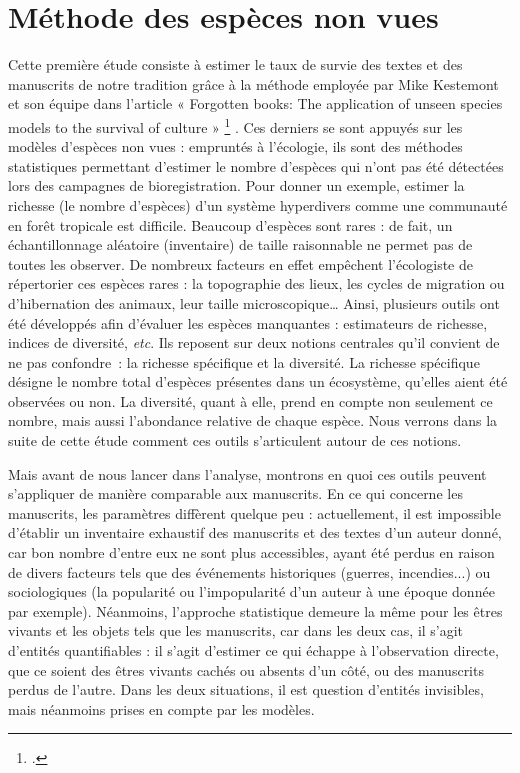 \documentclass[a4paper,twoside,12pt]{book}
\begin{document}
\chapter{Méthode des espèces non vues}


Cette première étude consiste à estimer le taux de survie des textes et des manuscrits de notre tradition grâce à la méthode employée par Mike Kestemont et son équipe dans l’article « Forgotten books: The application of unseen species models to the survival of culture » \footcite{kestemont} . Ces derniers se sont appuyés sur les modèles d’espèces non vues : empruntés à l’écologie, ils sont des méthodes statistiques permettant d’estimer le nombre d'espèces qui n’ont pas été détectées lors des campagnes de bioregistration. Pour donner un exemple, estimer la richesse (le nombre d’espèces) d’un système hyperdivers comme une communauté en forêt tropicale est difficile. Beaucoup d’espèces sont rares : de fait, un échantillonnage aléatoire (inventaire) de taille raisonnable ne permet pas de toutes les observer. De nombreux facteurs en effet empêchent l’écologiste de répertorier ces espèces rares : la topographie des lieux, les cycles de migration ou d’hibernation des animaux, leur taille microscopique… Ainsi, plusieurs outils ont été développés afin d’évaluer les espèces manquantes : estimateurs de richesse, indices de diversité, \textit{etc}. Ils reposent sur deux notions centrales qu’il convient de ne pas confondre~: la richesse spécifique et la diversité. La richesse spécifique désigne le nombre total d’espèces présentes dans un écosystème, qu’elles aient été observées ou non. La diversité, quant à elle, prend en compte non seulement ce nombre, mais aussi l’abondance relative de chaque espèce. Nous verrons dans la suite de cette étude comment ces outils s’articulent autour de ces notions.

Mais avant de nous lancer dans l’analyse, montrons en quoi ces outils peuvent s’appliquer de manière comparable aux manuscrits.
En ce qui concerne les manuscrits, les paramètres diffèrent quelque peu : actuellement, il est impossible d'établir un inventaire exhaustif des manuscrits et des textes d'un auteur donné, car bon nombre d'entre eux ne sont plus accessibles, ayant été perdus en raison de divers facteurs tels que des événements historiques (guerres, incendies...) ou sociologiques (la popularité ou l'impopularité d'un auteur à une époque donnée par exemple). Néanmoins, l'approche statistique demeure la même pour les êtres vivants et les objets tels que les manuscrits, car dans les deux cas, il s'agit d'entités quantifiables : il s’agit d’estimer ce qui échappe à l’observation directe, que ce soient des êtres vivants cachés ou absents d’un côté, ou des manuscrits perdus de l’autre. Dans les deux situations, il est question d’entités invisibles, mais néanmoins prises en compte par les modèles.
\end{document}
